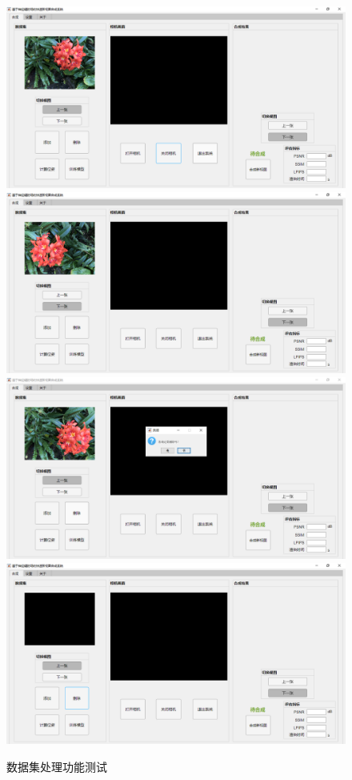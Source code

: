 \begin{figure}[thbp]
  \centering
  \subcaptionbox{\label{fig:datasetProcess-a}}
    {\includegraphics[width=0.55\linewidth]{figures/system/2-a.png}}
  \subcaptionbox{\label{fig:datasetProcess-b}}
    {\includegraphics[width=0.55\linewidth]{figures/system/2-b.png}}
  \subcaptionbox{\label{fig:datasetProcess-c}}
    {\includegraphics[width=0.55\linewidth]{figures/system/2-c.png}}
  \subcaptionbox{\label{fig:datasetProcess-d}}
    {\includegraphics[width=0.55\linewidth]{figures/system/2-d.png}}
  \caption{数据集处理功能测试}
  \label{fig:datasetProcess}
\end{figure}

